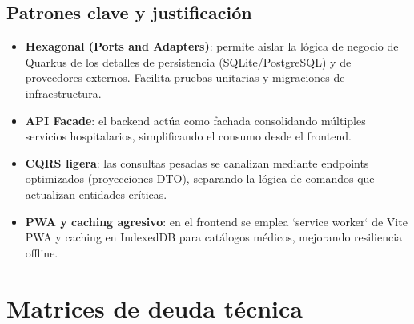 \documentclass[12pt,letterpaper]{article}
\begin{document}
\subsection{Patrones clave y justificación}
\begin{itemize}[leftmargin=1.2cm]
  \item \textbf{Hexagonal (Ports and Adapters)}: permite aislar la lógica de negocio de Quarkus de los detalles de persistencia (SQLite/PostgreSQL) y de proveedores externos. Facilita pruebas unitarias y migraciones de infraestructura.
  \item \textbf{API Facade}: el backend actúa como fachada consolidando múltiples servicios hospitalarios, simplificando el consumo desde el frontend.
  \item \textbf{CQRS ligera}: las consultas pesadas se canalizan mediante endpoints optimizados (proyecciones DTO), separando la lógica de comandos que actualizan entidades críticas.
  \item \textbf{PWA y caching agresivo}: en el frontend se emplea `service worker` de Vite PWA y caching en IndexedDB para catálogos médicos, mejorando resiliencia offline.
\end{itemize}

\section{Matrices de deuda técnica}
\end{document}
